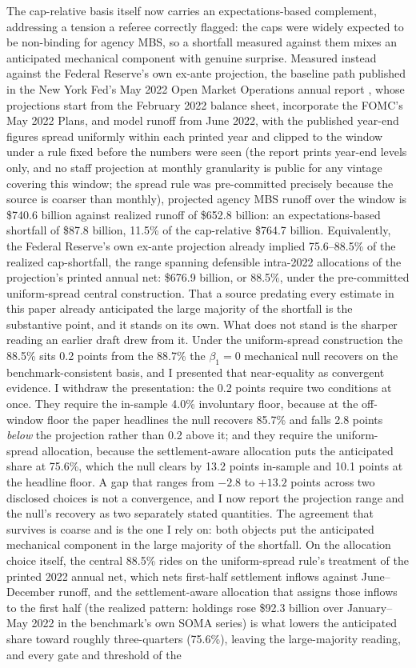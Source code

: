 \documentclass[12pt]{article}
\begin{document}
The cap-relative basis itself now carries an expectations-based complement, addressing a tension a referee correctly flagged: the caps were widely expected to be non-binding for agency MBS, so a shortfall measured against them mixes an anticipated mechanical component with genuine surprise. Measured instead against the Federal Reserve's own ex-ante projection, the baseline path published in the New York Fed's May 2022 Open Market Operations annual report \citep{omo2021}, whose projections start from the February 2022 balance sheet, incorporate the FOMC's May 2022 Plans, and model runoff from June 2022, with the published year-end figures spread uniformly within each printed year and clipped to the window under a rule fixed before the numbers were seen (the report prints year-end levels only, and no staff projection at monthly granularity is public for any vintage covering this window; the spread rule was pre-committed precisely because the source is coarser than monthly), projected agency MBS runoff over the window is \$740.6 billion against realized runoff of \$652.8 billion: an expectations-based shortfall of \$87.8 billion, 11.5\% of the cap-relative \$764.7 billion. Equivalently, the Federal Reserve's own ex-ante projection already implied 75.6--88.5\% of the realized cap-shortfall, the range spanning defensible intra-2022 allocations of the projection's printed annual net: \$676.9 billion, or 88.5\%, under the pre-committed uniform-spread central construction. That a source predating every estimate in this paper already anticipated the large majority of the shortfall is the substantive point, and it stands on its own. What does not stand is the sharper reading an earlier draft drew from it. Under the uniform-spread construction the 88.5\% sits 0.2 points from the 88.7\% the $\beta_1 = 0$ mechanical null recovers on the benchmark-consistent basis, and I presented that near-equality as convergent evidence. I withdraw the presentation: the 0.2 points require two conditions at once. They require the in-sample 4.0\% involuntary floor, because at the off-window floor the paper headlines the null recovers 85.7\% and falls 2.8 points \emph{below} the projection rather than 0.2 above it; and they require the uniform-spread allocation, because the settlement-aware allocation puts the anticipated share at 75.6\%, which the null clears by 13.2 points in-sample and 10.1 points at the headline floor. A gap that ranges from $-2.8$ to $+13.2$ points across two disclosed choices is not a convergence, and I now report the projection range and the null's recovery as two separately stated quantities. The agreement that survives is coarse and is the one I rely on: both objects put the anticipated mechanical component in the large majority of the shortfall. On the allocation choice itself, the central 88.5\% rides on the uniform-spread rule's treatment of the printed 2022 annual net, which nets first-half settlement inflows against June--December runoff, and the settlement-aware allocation that assigns those inflows to the first half (the realized pattern: holdings rose \$92.3 billion over January--May 2022 in the benchmark's own SOMA series) is what lowers the anticipated share toward roughly three-quarters (75.6\%), leaving the large-majority reading, and every gate and threshold of the 
\end{document}
